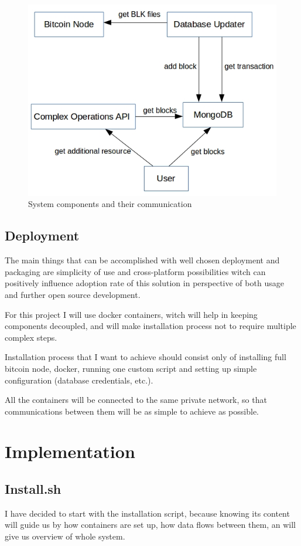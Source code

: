 \documentclass[12pt, en, eng]{mgr}
\begin{document}
\begin{figure}[H]
  \includegraphics[width=0.8\linewidth]{component-diagram.png}
  \caption{System components and their communication}
  \label{fig:system-components-and-their-communication}
\end{figure}



\subsection{Deployment}

The main things that can be accomplished with well chosen deployment and packaging are simplicity of use and cross-platform possibilities witch can positively influence adoption rate of this solution in perspective of both usage and further open source development.

For this project I will use docker containers, witch will help in keeping components decoupled, and will make installation process not to require multiple complex steps. 

Installation process that I want to achieve should consist only of installing full bitcoin node, docker, running one custom script and setting up simple configuration (database credentials, etc.).

All the containers will be connected to the same private network, so that communications between them will be as simple to achieve as possible.

\section{Implementation}

\subsection{Install.sh}
I have decided to start with the installation script, because knowing its content will guide us by how containers are set up, how data flows between them, an will give us overview of whole system.
\end{document}

